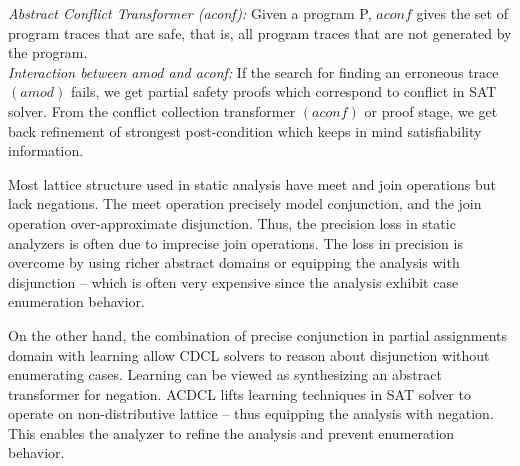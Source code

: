 \textit{Abstract Conflict Transformer (aconf):} Given a program P, $aconf$ gives the 
set of program traces that are safe, that is, all program traces that are not
generated by the program. \\

\textit{Interaction between amod and aconf:} If the search for finding an 
erroneous trace $(amod)$ fails, we get partial safety proofs which correspond 
to conflict in SAT solver. From the conflict collection transformer $(aconf)$ or 
proof stage, we get back refinement of strongest post-condition which keeps in 
mind satisfiability information. 

Most lattice structure used in static analysis have meet and join operations 
but lack negations. The meet operation precisely model conjunction, and
the join operation over-approximate disjunction. Thus, the precision loss in 
static analyzers is often due to imprecise join operations. The loss in precision is
overcome by using richer abstract domains or equipping the analysis with disjunction --
which is often very expensive since the analysis exhibit case enumeration behavior. 
 
On the other hand, the combination of precise conjunction in partial assignments domain 
with learning allow CDCL solvers to reason about disjunction without 
enumerating cases. Learning can be viewed as synthesizing an abstract transformer for 
negation. ACDCL lifts learning techniques in SAT solver to operate on non-distributive 
lattice -- thus equipping the analysis with negation. This enables the analyzer to refine 
the analysis and prevent enumeration behavior.
